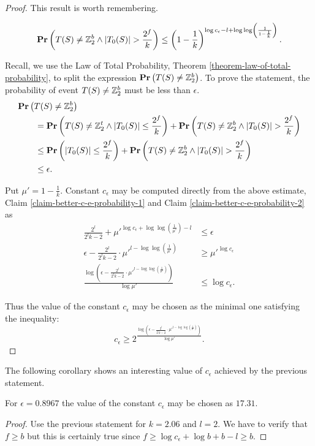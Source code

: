 \begin{proof}
This result is worth remembering.
\begin{claim}
\label{claim-better-c-e-probability-2}
\[
\mathbf{Pr}\left(T(S) \neq \mathbb{Z}_{2}^{b} \wedge |T_0(S)| > \frac {2 ^ f}{k}\right) \leq \left(1 - \frac{1}{k}\right) ^ {\log c_\epsilon - l + \log \log \left(\frac{1}{1 - \frac{1}{k}} \right)} \text{.}
\]
\end{claim}

Recall, we use the Law of Total Probability, Theorem \ref{theorem-law-of-total-probability}, to split the expression $\mathbf{Pr}\left(T(S) \neq \mathbb{Z}_{2}^{b}\right)$. To prove the statement, the probability of event $T(S) \neq \mathbb{Z}_{2}^{b}$ must be less than $\epsilon$.
\[
\begin{split}
& \mathbf{Pr}\left(T(S) \neq \mathbb{Z}_{2}^{b}\right) \\
	& \qquad = \mathbf{Pr}\left(T(S) \neq \mathbb{Z}_{2}^{t} \wedge |T_0(S)| \leq \frac {2 ^ f}{k}\right) + \mathbf{Pr}\left(T(S) \neq \mathbb{Z}_{2}^{b} \wedge |T_0(S)| > \frac {2 ^ f}{k}\right) \\
	& \qquad \leq \mathbf{Pr}\left(|T_0(S)| \leq \frac {2 ^ f}{k}\right) + \mathbf{Pr}\left(T(S) \neq \mathbb{Z}_{2}^{b} \wedge |T_0(S)| > \frac {2 ^ f}{k}\right) \\
	& \qquad \leq \epsilon \text{.}
\end{split}
\]

Put $\mu' = 1 - \frac{1}{k}$. Constant $c_\epsilon$ may be computed directly from the above estimate, Claim \ref{claim-better-c-e-probability-1} and Claim \ref{claim-better-c-e-probability-2} as
\[
\begin{split}
\frac{2^l}{2^l k - 2} + {\mu'}^{\log c_\epsilon + \log \log \left( \frac{1}{\mu'} \right) - l} & \leq \epsilon \\
{\epsilon - \frac{2^l}{2^l k - 2}}\cdot{{\mu'} ^ {l - \log \log \left(\frac{1}{\mu'}\right)}} & \geq {\mu'}^{\log c_\epsilon} \\
\frac{\log \left({\epsilon - \frac{2^l}{2^l k - 2}}\cdot{{\mu'} ^ {l - \log \log \left( \frac{1}{\mu'} \right)}}\right)}{\log {\mu'}} & \leq \log c_\epsilon \text{.}
\end{split}
\]

Thus the value of the constant $c_\epsilon$ may be chosen as the minimal one satisfying the inequality:
\[
c_\epsilon \geq 2 ^ {\frac{\log \left({\epsilon - \frac{2^l}{2^l k - 2}}\cdot{{\mu'} ^ {l - \log \log \left( \frac{1}{\mu'} \right)}}\right)}{\log {\mu'}}} \text{.}
\]
\end{proof}

The following corollary shows an interesting value of $c_\epsilon$ achieved by the previous statement.
\begin{corollary}
For $\epsilon = 0.8967$ the value of the constant $c_\epsilon$ may be chosen as $17.31$.
\end{corollary}
\begin{proof}
Use the previous statement for $k = 2.06$ and $l = 2$. We have to verify that $f \geq b$ but this is certainly true since $f \geq \log c_\epsilon + \log b + b - l \geq b$.
\end{proof}

